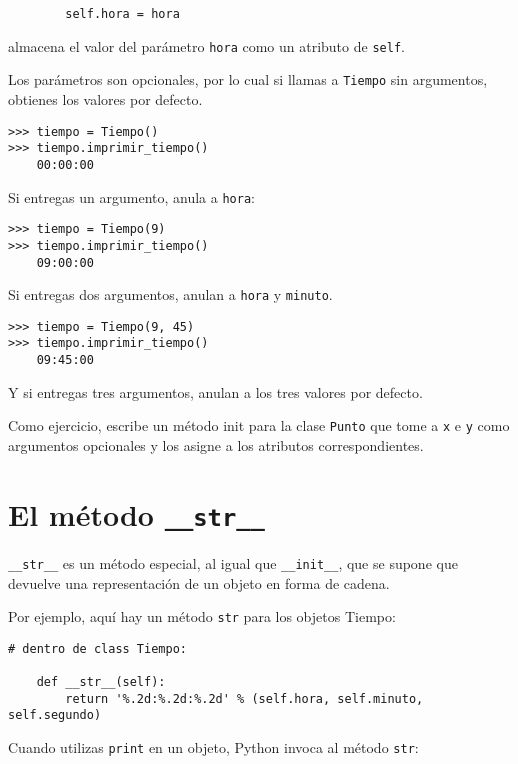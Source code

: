 \documentclass[10pt]{book}
\begin{document}
\begin{verbatim}
        self.hora = hora
\end{verbatim}
%
almacena el valor del parámetro {\tt hora} como un atributo
de {\tt self}.

Los parámetros son opcionales, por lo cual si llamas a {\tt Tiempo} sin
argumentos, obtienes los valores por defecto.

\begin{verbatim}
>>> tiempo = Tiempo()
>>> tiempo.imprimir_tiempo()
    00:00:00
\end{verbatim}
%
Si entregas un argumento, anula a {\tt hora}:

\begin{verbatim}
>>> tiempo = Tiempo(9)
>>> tiempo.imprimir_tiempo()
    09:00:00
\end{verbatim}
%
Si entregas dos argumentos, anulan a {\tt hora} y
{\tt minuto}.

\begin{verbatim}
>>> tiempo = Tiempo(9, 45)
>>> tiempo.imprimir_tiempo()
    09:45:00
\end{verbatim}
%
Y si entregas tres argumentos, anulan a los tres
valores por defecto.

Como ejercicio, escribe un método init para la clase {\tt Punto} que tome a
{\tt x} e {\tt y} como argumentos opcionales y los asigne
a los atributos correspondientes.


\section{El método {\tt \_\_str\_\_}}

\verb"__str__" es un método especial, al igual que \verb"__init__",
que se supone que devuelve una representación de un objeto en forma de cadena.

Por ejemplo, aquí hay un método {\tt str} para los objetos Tiempo:

\begin{verbatim}
# dentro de class Tiempo:

    def __str__(self):
        return '%.2d:%.2d:%.2d' % (self.hora, self.minuto, self.segundo)
\end{verbatim}
%
Cuando utilizas {\tt print} en un objeto, Python invoca al método {\tt str}:
\end{document}
